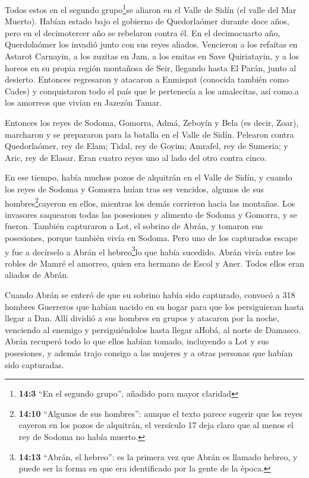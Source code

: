  Todos estos en el segundo grupo\footnote{\textbf{14:3} ``En
  el segundo grupo'', añadido para mayor claridad}se aliaron en el Valle
de Sidín (el valle del Mar Muerto).  Habían estado bajo el
gobierno de Quedorlaómer durante doce años, pero en el decimotercer año
se rebelaron contra él.  En el decimocuarto año,
Querdolaómer los invadió junto con sus reyes aliados. Vencieron a los
refaítas en Astarot Carnayin, a los zuzitas en Jam, a los emitas en Save
Quiriatayin,  y a los horeos en su propia región montañosa
de Seir, llegando hasta El Parán, junto al desierto. 
Entonces regresaron y atacaron a Enmispat (conocida también como Cades)
y conquistaron todo el país que le pertenecía a los amalecitas, así
como.a los amorreos que vivían en Jazezón Tamar.

 Entonces los reyes de Sodoma, Gomorra, Admá, Zeboyín y Bela
(es decir, Zoar), marcharon y se prepararon para la batalla en el Valle
de Sidín.  Pelearon contra Quedorlaómer, rey de Elam; Tidal,
rey de Goyim; Amrafel, rey de Sumeria; y Aric, rey de Elasar. Eran
cuatro reyes uno al lado del otro contra cinco.

 En ese tiempo, había muchos pozos de alquitrán en el Valle
de Sidín, y cuando los reyes de Sodoma y Gomorra huían tras ser
vencidos, algunos de sus hombres\footnote{\textbf{14:10} ``Algunos de
  sus hombres'': aunque el texto parece sugerir que los reyes cayeron en
  los pozos de alquitrán, el versículo 17 deja claro que al menos el rey
  de Sodoma no había muerto.}cayeron en ellos, mientras los demás
corrieron hacia las montañas.  Los invasores saquearon
todas las posesiones y alimento de Sodoma y Gomorra, y se fueron.
 También capturaron a Lot, el sobrino de Abrán, y tomaron
sus posesiones, porque también vivía en Sodoma.  Pero uno
de los capturados escape y fue a decírselo a Abrán el
hebreo\footnote{\textbf{14:13} ``Abrán, el hebreo'': es la primera vez
  que Abrán es llamado hebreo, y puede ser la forma en que era
  identificado por la gente de la época.}lo que había sucedido. Abrán
vivía entre los robles de Mamré el amorreo, quien era hermano de Escol y
Aner. Todos ellos eran aliados de Abrán.

 Cuando Abrán se enteró de que su sobrino había sido
capturado, convocó a 318 hombres Guerreros que habían nacido en su hogar
para que los persiguieran hasta llegar a Dan.  Allí dividió
a sus hombres en grupos y atacaron por la noche, venciendo al enemigo y
persiguiéndolos hasta llegar aHobá, al norte de Damasco. 
Abrán recuperó todo lo que ellos habían tomado, incluyendo a Lot y sus
posesiones, y además trajo consigo a las mujeres y a otras personas que
habían sido capturadas.

